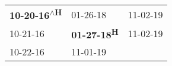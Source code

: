 \begin{supertabular}{lll}
 \textbf{10-20-16\textsuperscript{$\wedge$H}} &            01-26-18\textsuperscript{} &  11-02-19\textsuperscript{} \\
                   10-21-16\textsuperscript{} &  \textbf{01-27-18\textsuperscript{H}} &  11-02-19\textsuperscript{} \\
                   10-22-16\textsuperscript{} &            11-01-19\textsuperscript{} &                             \\
\end{supertabular}

